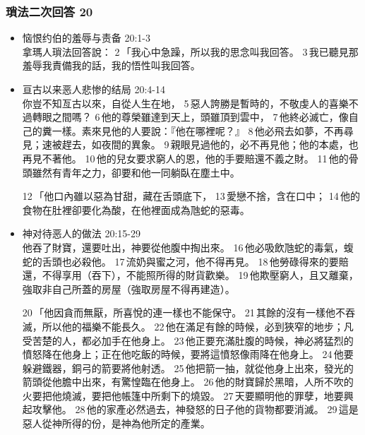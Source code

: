 \subsubsection{瑣法二次回答 20}
\begin{itemize}
\itemsep-.45em 
\item 恼恨约伯的羞辱与责备 20:1-3\\
拿瑪人瑣法回答說： 2 「我心中急躁，所以我的思念叫我回答。 3 我已聽見那羞辱我責備我的話，我的悟性叫我回答。
\item 亘古以来恶人悲惨的结局 20:4-14\\
你豈不知亙古以來，自從人生在地， 5 惡人誇勝是暫時的，不敬虔人的喜樂不過轉眼之間嗎？ 6 他的尊榮雖達到天上，頭雖頂到雲中， 7 他終必滅亡，像自己的糞一樣。素來見他的人要說：『他在哪裡呢？』 8 他必飛去如夢，不再尋見；速被趕去，如夜間的異象。 9 親眼見過他的，必不再見他；他的本處，也再見不著他。 10 他的兒女要求窮人的恩，他的手要賠還不義之財。 11 他的骨頭雖然有青年之力，卻要和他一同躺臥在塵土中。

12 「他口內雖以惡為甘甜，藏在舌頭底下， 13 愛戀不捨，含在口中； 14 他的食物在肚裡卻要化為酸，在他裡面成為虺蛇的惡毒。
\item 神对待恶人的做法 20:15-29\\
他吞了財寶，還要吐出，神要從他腹中掏出來。 16 他必吸飲虺蛇的毒氣，蝮蛇的舌頭也必殺他。 17 流奶與蜜之河，他不得再見。 18 他勞碌得來的要賠還，不得享用（吞下），不能照所得的財貨歡樂。 19 他欺壓窮人，且又離棄，強取非自己所蓋的房屋（強取房屋不得再建造）。

20 「他因貪而無厭，所喜悅的連一樣也不能保守。 21 其餘的沒有一樣他不吞滅，所以他的福樂不能長久。 22 他在滿足有餘的時候，必到狹窄的地步；凡受苦楚的人，都必加手在他身上。 23 他正要充滿肚腹的時候，神必將猛烈的憤怒降在他身上；正在他吃飯的時候，要將這憤怒像雨降在他身上。 24 他要躲避鐵器，銅弓的箭要將他射透。 25 他把箭一抽，就從他身上出來，發光的箭頭從他膽中出來，有驚惶臨在他身上。 26 他的財寶歸於黑暗，人所不吹的火要把他燒滅，要把他帳篷中所剩下的燒毀。 27 天要顯明他的罪孽，地要興起攻擊他。 28 他的家產必然過去，神發怒的日子他的貨物都要消滅。 29 這是惡人從神所得的份，是神為他所定的產業。
\end{itemize}

